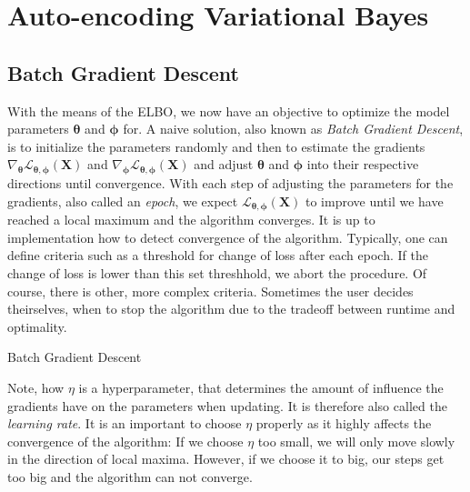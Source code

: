 \documentclass[12pt]{report}
\theoremstyle{definition}
\begin{document}
\section{Auto-encoding Variational Bayes}
\subsection{Batch Gradient Descent}
With the means of the ELBO, we now have an objective to optimize the model parameters $\pmb{\theta}$ and $\pmb{\phi}$ for. A naive solution, also known as \emph{Batch Gradient Descent}, is to initialize the parameters randomly and then to estimate the gradients $\nabla_{\pmb{\theta}}\mathcal{L}_{\pmb{\theta}, \pmb{\phi}}(\mathbf{X})$ and $\nabla_{\pmb{\pmb{\phi}}}\mathcal{L}_{\pmb{\theta}, \pmb{\phi}}(\mathbf{X})$ and adjust $\pmb{\theta}$ and $\pmb{\phi}$ into their respective directions until convergence. With each step of adjusting the parameters for the gradients, also called an \emph{epoch}, we expect $\mathcal{L}_{\pmb{\theta}, \pmb{\phi}}(\mathbf{X})$ to improve until we have reached a local maximum and the algorithm converges. It is up to implementation how to detect convergence of the algorithm. Typically, one can define criteria such as a threshold for change of loss after each epoch. If the change of loss is lower than this set threshhold, we abort the procedure. Of course, there is other, more complex criteria. Sometimes the user decides theirselves, when to stop the algorithm due to the tradeoff between runtime and optimality.

\begin{algorithm}[H]
\SetAlgoLined
{}
\caption{Batch Gradient Descent}
\end{algorithm} 

Note, how $\eta$ is a hyperparameter, that determines the amount of influence the gradients have on the parameters when updating. It is therefore also called the \emph{learning rate}. It is an important to choose $\eta$ properly as it highly affects the convergence of the algorithm: If we choose $\eta$ too small, we will only move slowly in the direction of local maxima. However, if we choose it to big, our steps get too big and the algorithm can not converge. 
\end{document}
